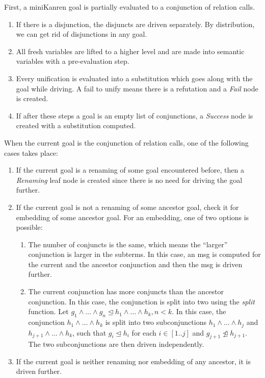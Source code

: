 \documentclass{llncs}
\begin{document}
First, a miniKanren goal is partially evaluated to a conjunction of relation calls.

\begin{enumerate}
  \item If there is a disjunction, the disjuncts are driven separately. By distribution, we can get rid of disjunctions in any goal. 
  \item All fresh variables are lifted to a higher level and are made into semantic variables with a pre-evaluation step.
  \item Every unification is evaluated into a substitution which goes along with the goal while driving. A fail to unify means there is a refutation and a \emph{Fail} node is created. 
  \item If after these steps a goal is an empty list of conjunctions, a \emph{Success} node is created with a substitution computed. 
\end{enumerate}

When the current goal is the conjunction of relation calls, one of the following cases takes place: 
\begin{enumerate}
  \item If the current goal is a renaming of some goal encountered before, then a \emph{Renaming} leaf node is created since there is no need for driving the goal further. 
  \item If the current goal is not a renaming of some ancestor goal, check it for embedding of some ancestor goal. For an embedding, one of two options is possible:
  \begin{enumerate}
    \item The number of conjuncts is the same, which means the ``larger'' conjunction is larger in the subterms. In this case, an msg is computed for the current and the ancestor conjunction and then the msg is driven further. 
    \item The current conjunction has more conjuncts than the ancestor conjunction. In this case, the conjunction is split into two using the \emph{split} function. Let $g_1 \wedge \dots \wedge g_n \trianglelefteq h_1 \wedge \dots \wedge h_k, n < k$. In this case, the conjunction $h_1 \wedge \dots \wedge h_k$ is split into two subconjunctions $h_1 \wedge \dots \wedge h_j$ and $h_{j+1} \wedge \dots \wedge h_k$, such that $g_i \trianglelefteq h_i$ for each $i \in [1..j]$ and $g_{j+1} \ntrianglelefteq h_{j+1}$. The two subconjunctions are then driven independently. 
  \end{enumerate}     
  \item If the current goal is neither renaming nor embedding of any ancestor, it is driven further. 
\end{enumerate}
\end{document}
